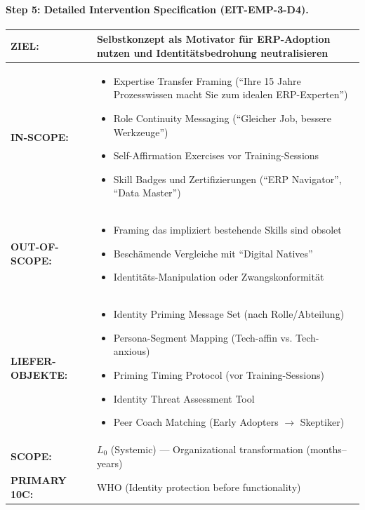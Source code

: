 \paragraph{Step 5: Detailed Intervention Specification (EIT-EMP-3-D4).}

\begin{tcolorbox}[colback=blue!5!white, colframe=blue!75!black,
    title=\textbf{Identity Priming --- Full Specification}]

\begin{tabular}{@{}p{2.5cm}p{10cm}@{}}
\textbf{ZIEL:} & Selbstkonzept als Motivator für ERP-Adoption nutzen und Identitätsbedrohung neutralisieren \\
\midrule
\textbf{IN-SCOPE:} &
\begin{itemize}[nosep,leftmargin=*]
    \item[\checkmark] Expertise Transfer Framing (``Ihre 15 Jahre Prozesswissen macht Sie zum idealen ERP-Experten'')
    \item[\checkmark] Role Continuity Messaging (``Gleicher Job, bessere Werkzeuge'')
    \item[\checkmark] Self-Affirmation Exercises vor Training-Sessions
    \item[\checkmark] Skill Badges und Zertifizierungen (``ERP Navigator'', ``Data Master'')
\end{itemize} \\
\midrule
\textbf{OUT-OF-SCOPE:} &
\begin{itemize}[nosep,leftmargin=*]
    \item[$\times$] Framing das impliziert bestehende Skills sind obsolet
    \item[$\times$] Beschämende Vergleiche mit ``Digital Natives''
    \item[$\times$] Identitäts-Manipulation oder Zwangskonformität
\end{itemize} \\
\midrule
\textbf{LIEFER-OBJEKTE:} &
\begin{itemize}[nosep,leftmargin=*]
    \item[$\square$] Identity Priming Message Set (nach Rolle/Abteilung)
    \item[$\square$] Persona-Segment Mapping (Tech-affin vs. Tech-anxious)
    \item[$\square$] Priming Timing Protocol (vor Training-Sessions)
    \item[$\square$] Identity Threat Assessment Tool
    \item[$\square$] Peer Coach Matching (Early Adopters $\to$ Skeptiker)
\end{itemize} \\
\midrule
\textbf{SCOPE:} & $L_0$ (Systemic) --- Organizational transformation (months--years) \\
\textbf{PRIMARY 10C:} & WHO (Identity protection before functionality) \\
\end{tabular}

\end{tcolorbox}


